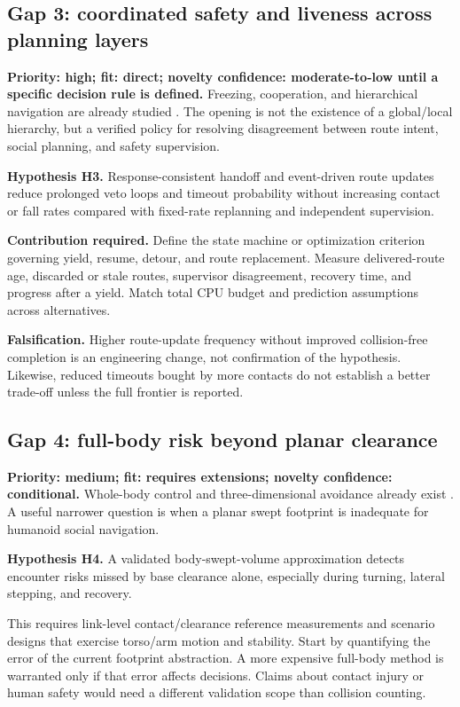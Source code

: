 \documentclass[11pt,a4paper]{article}
\begin{document}
\subsection{Gap 3: coordinated safety and liveness across planning layers}
\label{gap:liveness}
\textbf{Priority: high; fit: direct; novelty confidence: moderate-to-low
until a specific decision rule is defined.} Freezing, cooperation, and
hierarchical navigation are already studied
\citep{freezing,rgl,parkour,wheeledleg}. The opening is not the existence of
a global/local hierarchy, but a verified policy for resolving disagreement
between route intent, social planning, and safety supervision.

\textbf{Hypothesis H3.} Response-consistent handoff and event-driven route
updates reduce prolonged veto loops and timeout probability without
increasing contact or fall rates compared with fixed-rate replanning and
independent supervision.

\textbf{Contribution required.} Define the state machine or optimization
criterion governing yield, resume, detour, and route replacement. Measure
delivered-route age, discarded or stale routes, supervisor disagreement,
recovery time, and progress after a yield. Match total CPU budget and
prediction assumptions across alternatives.

\textbf{Falsification.} Higher route-update frequency without improved
collision-free completion is an engineering change, not confirmation of
the hypothesis. Likewise, reduced timeouts bought by more contacts do not
establish a better trade-off unless the full frontier is reported.

\subsection{Gap 4: full-body risk beyond planar clearance}
\label{gap:body}
\textbf{Priority: medium; fit: requires extensions; novelty confidence:
conditional.} Whole-body control and three-dimensional avoidance already
exist \citep{expressive,asap,safehumanoid,omni}. A useful narrower question
is when a planar swept footprint is inadequate for humanoid social navigation.

\textbf{Hypothesis H4.} A validated body-swept-volume approximation detects
encounter risks missed by base clearance alone, especially during turning,
lateral stepping, and recovery.

This requires link-level contact/clearance reference measurements and
scenario designs that exercise torso/arm motion and stability. Start by
quantifying the error of the current footprint abstraction. A more expensive
full-body method is warranted only if that error affects decisions. Claims
about contact injury or human safety would need a different validation
scope than collision counting.
\end{document}
